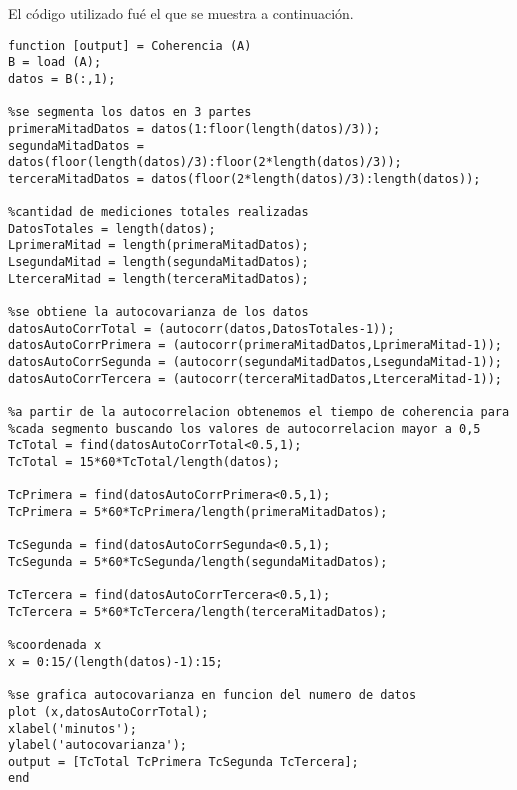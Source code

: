 \documentclass[12pt]{article}
\begin{document}
El código utilizado fué el que se muestra a continuación.

\small
\begin{verbatim}
function [output] = Coherencia (A)
B = load (A);
datos = B(:,1); 
		    
%se segmenta los datos en 3 partes
primeraMitadDatos = datos(1:floor(length(datos)/3));
segundaMitadDatos = datos(floor(length(datos)/3):floor(2*length(datos)/3));
terceraMitadDatos = datos(floor(2*length(datos)/3):length(datos)); 
							    
%cantidad de mediciones totales realizadas
DatosTotales = length(datos);
LprimeraMitad = length(primeraMitadDatos);
LsegundaMitad = length(segundaMitadDatos);
LterceraMitad = length(terceraMitadDatos);
								    
%se obtiene la autocovarianza de los datos
datosAutoCorrTotal = (autocorr(datos,DatosTotales-1));
datosAutoCorrPrimera = (autocorr(primeraMitadDatos,LprimeraMitad-1));
datosAutoCorrSegunda = (autocorr(segundaMitadDatos,LsegundaMitad-1));
datosAutoCorrTercera = (autocorr(terceraMitadDatos,LterceraMitad-1));
																		    
%a partir de la autocorrelacion obtenemos el tiempo de coherencia para
%cada segmento buscando los valores de autocorrelacion mayor a 0,5
TcTotal = find(datosAutoCorrTotal<0.5,1);
TcTotal = 15*60*TcTotal/length(datos);
																							     
TcPrimera = find(datosAutoCorrPrimera<0.5,1);
TcPrimera = 5*60*TcPrimera/length(primeraMitadDatos);
																				      
TcSegunda = find(datosAutoCorrSegunda<0.5,1);
TcSegunda = 5*60*TcSegunda/length(segundaMitadDatos);
																								      
TcTercera = find(datosAutoCorrTercera<0.5,1);
TcTercera = 5*60*TcTercera/length(terceraMitadDatos);
																							      
%coordenada x
x = 0:15/(length(datos)-1):15;
																		      
%se grafica autocovarianza en funcion del numero de datos 
plot (x,datosAutoCorrTotal);
xlabel('minutos');
ylabel('autocovarianza');
output = [TcTotal TcPrimera TcSegunda TcTercera];
end
\end{verbatim}
\normalsize
\end{document}
